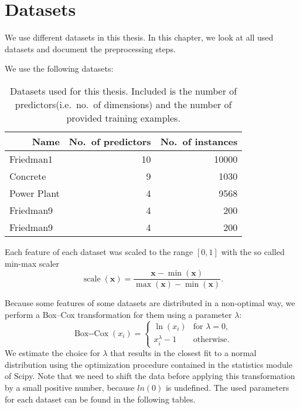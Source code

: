 \chapter{Datasets}\label{cha:datasets}
We use different datasets in this thesis.
In this chapter, we look at all used datasets and document the preprocessing
steps.

We use the following datasets:

\begin{table}[h]
\begin{tabular}[c]{lrr}
  \toprule \multicolumn{1}{r}{\textbf{Name}}
& \multicolumn{1}{r}{\textbf{No.~of predictors}}
& \multicolumn{1}{r}{\textbf{No.~of instances}}
\\\midrule
  Friedman1 & 10 & 10000 \\
  Concrete & 9 & 1030 \\
  Power Plant & 4 & 9568 \\
  Friedman9 & 4  & 200 \\
  Friedman9 & 4  & 200
\\\bottomrule
\end{tabular}
\caption[List of Datasets]{Datasets used for this thesis.
  Included is the number of predictors(i.e.~no.~of dimensions) and the number of provided training examples.}
\end{table}

Each feature of each dataset was scaled to the range \([0,1]\) with the so called min-max
scaler
\begin{equation*}
  \operatorname{scale}(\bm{x}) = \frac{\bm{x} - \min({\bm{x}})}{\max{(\bm{x}) - \min(\bm{x})}}.
\end{equation*}

Because some features of some datasets are distributed in a non-optimal way, we perform a Box--Cox transformation for them using a parameter \(\lambda\):
\begin{equation*}
  \operatorname{Box--Cox}(x_i) =
  \begin{cases}
    \ln(x_i) & \text{for } \lambda = 0, \\
    x_i^\lambda - 1 & \text{otherwise}.
  \end{cases}
\end{equation*}
We estimate the choice for \(\lambda\) that results in the closest fit to a
normal distribution using the optimization procedure contained in the statistics module of Scipy.
Note that we need to shift the data before applying this transformation by a small positive number, because \(ln(0)\) is undefined.
The used parameters for each dataset can be found in the following tables.

